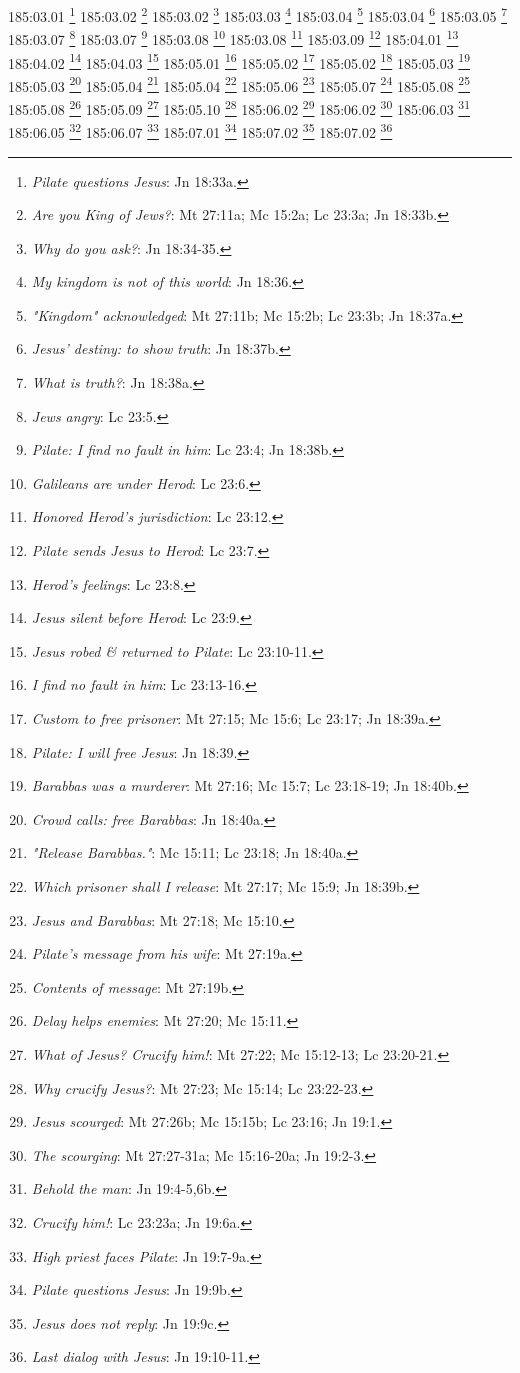185:03.01 \footnote{\textit{Pilate questions Jesus}: Jn 18:33a.}
185:03.02 \footnote{\textit{Are you King of Jews?}: Mt 27:11a; Mc 15:2a; Lc 23:3a; Jn 18:33b.}
185:03.02 \footnote{\textit{Why do you ask?}: Jn 18:34-35.}
185:03.03 \footnote{\textit{My kingdom is not of this world}: Jn 18:36.}
185:03.04 \footnote{\textit{"Kingdom" acknowledged}: Mt 27:11b; Mc 15:2b; Lc 23:3b; Jn 18:37a.}
185:03.04 \footnote{\textit{Jesus' destiny: to show truth}: Jn 18:37b.}
185:03.05 \footnote{\textit{What is truth?}: Jn 18:38a.}
185:03.07 \footnote{\textit{Jews angry}: Lc 23:5.}
185:03.07 \footnote{\textit{Pilate: I find no fault in him}: Lc 23:4; Jn 18:38b.}
185:03.08 \footnote{\textit{Galileans are under Herod}: Lc 23:6.}
185:03.08 \footnote{\textit{Honored Herod's jurisdiction}: Lc 23:12.}
185:03.09 \footnote{\textit{Pilate sends Jesus to Herod}: Lc 23:7.}
185:04.01 \footnote{\textit{Herod's feelings}: Lc 23:8.}
185:04.02 \footnote{\textit{Jesus silent before Herod}: Lc 23:9.}
185:04.03 \footnote{\textit{Jesus robed & returned to Pilate}: Lc 23:10-11.}
185:05.01 \footnote{\textit{I find no fault in him}: Lc 23:13-16.}
185:05.02 \footnote{\textit{Custom to free prisoner}: Mt 27:15; Mc 15:6; Lc 23:17; Jn 18:39a.}
185:05.02 \footnote{\textit{Pilate: I will free Jesus}: Jn 18:39.}
185:05.03 \footnote{\textit{Barabbas was a murderer}: Mt 27:16; Mc 15:7; Lc 23:18-19; Jn 18:40b.}
185:05.03 \footnote{\textit{Crowd calls: free Barabbas}: Jn 18:40a.}
185:05.04 \footnote{\textit{"Release Barabbas."}: Mc 15:11; Lc 23:18; Jn 18:40a.}
185:05.04 \footnote{\textit{Which prisoner shall I release}: Mt 27:17; Mc 15:9; Jn 18:39b.}
185:05.06 \footnote{\textit{Jesus and Barabbas}: Mt 27:18; Mc 15:10.}
185:05.07 \footnote{\textit{Pilate's message from his wife}: Mt 27:19a.}
185:05.08 \footnote{\textit{Contents of message}: Mt 27:19b.}
185:05.08 \footnote{\textit{Delay helps enemies}: Mt 27:20; Mc 15:11.}
185:05.09 \footnote{\textit{What of Jesus? Crucify him!}: Mt 27:22; Mc 15:12-13; Lc 23:20-21.}
185:05.10 \footnote{\textit{Why crucify Jesus?}: Mt 27:23; Mc 15:14; Lc 23:22-23.}
185:06.02 \footnote{\textit{Jesus scourged}: Mt 27:26b; Mc 15:15b; Lc 23:16; Jn 19:1.}
185:06.02 \footnote{\textit{The scourging}: Mt 27:27-31a; Mc 15:16-20a; Jn 19:2-3.}
185:06.03 \footnote{\textit{Behold the man}: Jn 19:4-5,6b.}
185:06.05 \footnote{\textit{Crucify him!}: Lc 23:23a; Jn 19:6a.}
185:06.07 \footnote{\textit{High priest faces Pilate}: Jn 19:7-9a.}
185:07.01 \footnote{\textit{Pilate questions Jesus}: Jn 19:9b.}
185:07.02 \footnote{\textit{Jesus does not reply}: Jn 19:9c.}
185:07.02 \footnote{\textit{Last dialog with Jesus}: Jn 19:10-11.}
